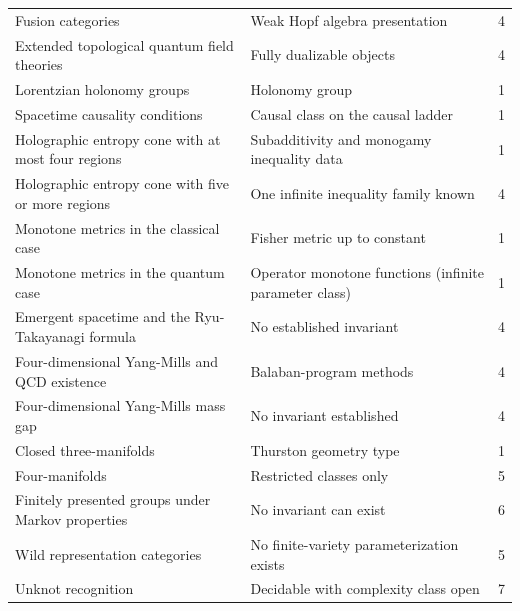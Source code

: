 \documentclass[11pt,letterpaper]{article}
\theoremstyle{definition}
\begin{document}
{\begin{longtable}{L{0.32\textwidth} L{0.36\textwidth} L{0.10\textwidth}}
Fusion categories & Weak Hopf algebra presentation & 4 \\
Extended topological quantum field theories & Fully dualizable objects & 4 \\
Lorentzian holonomy groups & Holonomy group & 1 \\
Spacetime causality conditions & Causal class on the causal ladder & 1 \\
Holographic entropy cone with at most four regions & Subadditivity and monogamy inequality data & 1 \\
Holographic entropy cone with five or more regions & One infinite inequality family known & 4 \\
Monotone metrics in the classical case & Fisher metric up to constant & 1 \\
Monotone metrics in the quantum case & Operator monotone functions (infinite parameter class) & 1 \\
Emergent spacetime and the Ryu-Takayanagi formula & No established invariant & 4 \\
Four-dimensional Yang-Mills and QCD existence & Balaban-program methods & 4 \\
Four-dimensional Yang-Mills mass gap & No invariant established & 4 \\
Closed three-manifolds & Thurston geometry type & 1 \\
Four-manifolds & Restricted classes only & 5 \\
Finitely presented groups under Markov properties & No invariant can exist & 6 \\
Wild representation categories & No finite-variety parameterization exists & 5 \\
Unknot recognition & Decidable with complexity class open & 7 \\
\bottomrule
\end{longtable}}
\end{document}
